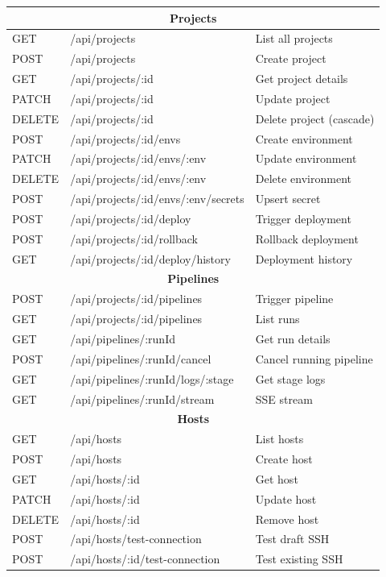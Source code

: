 \documentclass[12pt,a4paper,twoside]{report}
\begin{document}
\begin{longtable}{l|l|p{7cm}}
\multicolumn{3}{c}{\textbf{Projects}} \\
\midrule
GET & /api/projects & List all projects \\
POST & /api/projects & Create project \\
GET & /api/projects/:id & Get project details \\
PATCH & /api/projects/:id & Update project \\
DELETE & /api/projects/:id & Delete project (cascade) \\
POST & /api/projects/:id/envs & Create environment \\
PATCH & /api/projects/:id/envs/:env & Update environment \\
DELETE & /api/projects/:id/envs/:env & Delete environment \\
POST & /api/projects/:id/envs/:env/secrets & Upsert secret \\
POST & /api/projects/:id/deploy & Trigger deployment \\
POST & /api/projects/:id/rollback & Rollback deployment \\
GET & /api/projects/:id/deploy/history & Deployment history \\
\midrule

\multicolumn{3}{c}{\textbf{Pipelines}} \\
\midrule
POST & /api/projects/:id/pipelines & Trigger pipeline \\
GET & /api/projects/:id/pipelines & List runs \\
GET & /api/pipelines/:runId & Get run details \\
POST & /api/pipelines/:runId/cancel & Cancel running pipeline \\
GET & /api/pipelines/:runId/logs/:stage & Get stage logs \\
GET & /api/pipelines/:runId/stream & SSE stream \\
\midrule

\multicolumn{3}{c}{\textbf{Hosts}} \\
\midrule
GET & /api/hosts & List hosts \\
POST & /api/hosts & Create host \\
GET & /api/hosts/:id & Get host \\
PATCH & /api/hosts/:id & Update host \\
DELETE & /api/hosts/:id & Remove host \\
POST & /api/hosts/test-connection & Test draft SSH \\
POST & /api/hosts/:id/test-connection & Test existing SSH \\
\midrule


\end{longtable}
\end{document}
